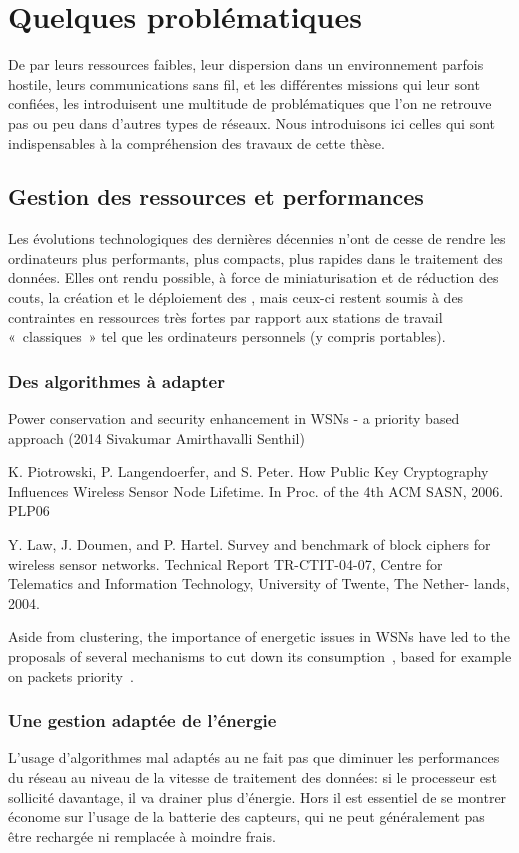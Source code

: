 \section{Quelques problématiques}

De par leurs ressources faibles, leur dispersion dans un environnement parfois hostile, leurs communications sans fil, et les différentes missions qui leur sont confiées, les \rcsfs introduisent une multitude de problématiques que l'on ne retrouve pas ou peu dans d'autres types de réseaux.
Nous introduisons ici celles qui sont indispensables à la compréhension des travaux de cette thèse.

    \subsection{Gestion des ressources et performances}
Les évolutions technologiques des dernières décennies n'ont de cesse de rendre les ordinateurs plus performants, plus compacts, plus rapides dans le traitement des données.
Elles ont rendu possible, à force de miniaturisation et de réduction des couts, la création et le déploiement des \rcsfs, mais ceux-ci restent soumis à des contraintes en ressources très fortes par rapport aux stations de travail « classiques » tel que les ordinateurs personnels (y compris portables).

        \subsubsection{Des algorithmes à adapter}
Power conservation and security enhancement in WSNs - a priority based approach (2014 Sivakumar Amirthavalli Senthil)

K. Piotrowski, P. Langendoerfer, and S. Peter. How Public Key Cryptography Influences Wireless Sensor Node Lifetime. In Proc. of the 4th ACM SASN, 2006.
PLP06

Y. Law, J. Doumen, and P. Hartel. Survey and benchmark of block ciphers for wireless sensor networks. Technical Report TR-CTIT-04-07, Centre for Telematics and Information Technology, University of Twente, The Nether- lands, 2004.

Aside from clustering, the importance of energetic issues in WSNs have led to the proposals of several mechanisms to cut down its consumption~\cite{ACFP09}, based for example on packets priority~\cite{SAS14}.

        \subsubsection{Une gestion adaptée de l'énergie}
L'usage d'algorithmes mal adaptés au \rcs ne fait pas que diminuer les performances du réseau au niveau de la vitesse de traitement des données: si le processeur est sollicité davantage, il va drainer plus d'énergie.
Hors il est essentiel de se montrer économe sur l'usage de la batterie des capteurs, qui ne peut généralement pas être rechargée ni remplacée à moindre frais.

